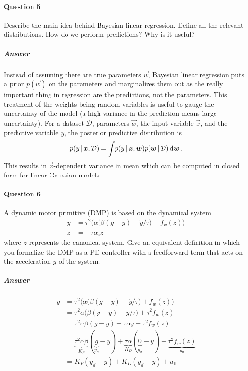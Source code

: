 	\paragraph{Question 5}
		Describe the main idea behind Bayesian linear regression. Define all the relevant distributions. How do we perform predictions? Why is it useful?

		\subparagraph{Answer}
			Instead of assuming there are true parameters \(\vec{w}\), Bayesian linear regression puts a prior \(p(\vec{w})\) on the parameters and marginalizes them out as the really important thing in regression are the predictions, not the parameters. This treatment of the weights being random variables is useful to gauge the uncertainty of the model (a high variance in the prediction means large uncertainty). For a dataset \(\mathcal{D}\), parameters \(\vec{w}\), the input variable \(\vec{x}\), and the predictive variable \(y\), the posterior predictive distribution is
			\begin{equation*}
				p(y \,\vert\, \bm{x}, \mathcal{D}) = \int\! p(y \,\vert\, \bm{x}, \bm{w}) p(\bm{w} \,\vert\, \mathcal{D}) \dd{\bm{w}}.
			\end{equation*}
			This results in \(\vec{x}\)-dependent variance in mean which can be computed in closed form for linear Gaussian models.

	\paragraph{Question 6}
		A dynamic motor primitive (DMP) is based on the dynamical system
		\begin{align*}
			\ddot{y} &= \tau^2 \Big( \alpha \big( \beta (g - y) - \dot{y} / \tau \big) + f_w(z) \Big) \\
			 \dot{z} &= -\tau \alpha_z z
		\end{align*}
		where \(z\) represents the canonical system. Give an equivalent definition in which you formalize the DMP as a PD-controller with a feedforward term that acts on the acceleration \(\ddot{y}\) of the system.

		\subparagraph{Answer}
			\begin{align*}
				\ddot{y}
					&= \tau^2 \Big( \alpha \big( \beta (g - y) - \dot{y} / \tau \big) + f_w(z) \Big) \\
					&= \tau^2 \alpha \big( \beta (g - y) - \dot{y} / \tau \big) + \tau^2 f_w(z) \\
					&= \tau^2 \alpha \beta (g - y) - \tau \alpha \dot{y} + \tau^2 f_w(z) \\
					&= \underbrace{\tau^2 \alpha \beta}_{K_P} (\underbrace{g}_{y_d} - y) + \underbrace{\tau \alpha}_{K_D} (\underbrace{0}_{\dot{y}_d} - \dot{y}) + \underbrace{\tau^2 f_w(z)}_{u_\mathrm{ff}} \\
					&= K_P (y_d - y) + K_D (\dot{y}_d - \dot{y}) + u_\mathrm{ff}
			\end{align*}

